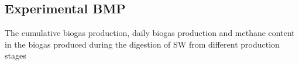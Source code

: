 \subsection{Experimental BMP}
The cumulative biogas production, daily biogas production and methane content in the biogas produced during the digestion of SW from different production stages